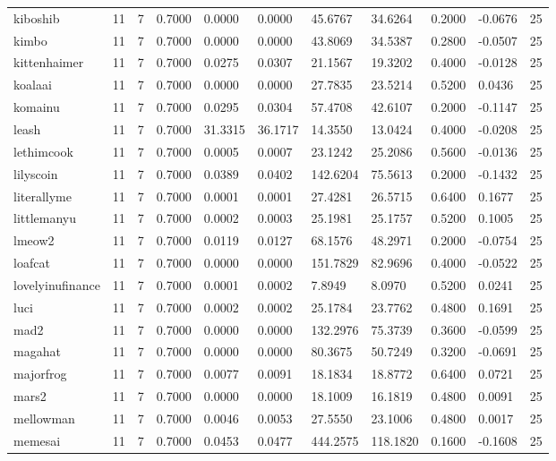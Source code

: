 \begin{table}[htbp]
\begin{tabular}{lllllllllll}
kiboshib & 11 & 7 & 0.7000 & 0.0000 & 0.0000 & 45.6767 & 34.6264 & 0.2000 & -0.0676 & 25 \\
kimbo & 11 & 7 & 0.7000 & 0.0000 & 0.0000 & 43.8069 & 34.5387 & 0.2800 & -0.0507 & 25 \\
kittenhaimer & 11 & 7 & 0.7000 & 0.0275 & 0.0307 & 21.1567 & 19.3202 & 0.4000 & -0.0128 & 25 \\
koalaai & 11 & 7 & 0.7000 & 0.0000 & 0.0000 & 27.7835 & 23.5214 & 0.5200 & 0.0436 & 25 \\
komainu & 11 & 7 & 0.7000 & 0.0295 & 0.0304 & 57.4708 & 42.6107 & 0.2000 & -0.1147 & 25 \\
leash & 11 & 7 & 0.7000 & 31.3315 & 36.1717 & 14.3550 & 13.0424 & 0.4000 & -0.0208 & 25 \\
lethimcook & 11 & 7 & 0.7000 & 0.0005 & 0.0007 & 23.1242 & 25.2086 & 0.5600 & -0.0136 & 25 \\
lilyscoin & 11 & 7 & 0.7000 & 0.0389 & 0.0402 & 142.6204 & 75.5613 & 0.2000 & -0.1432 & 25 \\
literallyme & 11 & 7 & 0.7000 & 0.0001 & 0.0001 & 27.4281 & 26.5715 & 0.6400 & 0.1677 & 25 \\
littlemanyu & 11 & 7 & 0.7000 & 0.0002 & 0.0003 & 25.1981 & 25.1757 & 0.5200 & 0.1005 & 25 \\
lmeow2 & 11 & 7 & 0.7000 & 0.0119 & 0.0127 & 68.1576 & 48.2971 & 0.2000 & -0.0754 & 25 \\
loafcat & 11 & 7 & 0.7000 & 0.0000 & 0.0000 & 151.7829 & 82.9696 & 0.4000 & -0.0522 & 25 \\
lovelyinufinance & 11 & 7 & 0.7000 & 0.0001 & 0.0002 & 7.8949 & 8.0970 & 0.5200 & 0.0241 & 25 \\
luci & 11 & 7 & 0.7000 & 0.0002 & 0.0002 & 25.1784 & 23.7762 & 0.4800 & 0.1691 & 25 \\
mad2 & 11 & 7 & 0.7000 & 0.0000 & 0.0000 & 132.2976 & 75.3739 & 0.3600 & -0.0599 & 25 \\
magahat & 11 & 7 & 0.7000 & 0.0000 & 0.0000 & 80.3675 & 50.7249 & 0.3200 & -0.0691 & 25 \\
majorfrog & 11 & 7 & 0.7000 & 0.0077 & 0.0091 & 18.1834 & 18.8772 & 0.6400 & 0.0721 & 25 \\
mars2 & 11 & 7 & 0.7000 & 0.0000 & 0.0000 & 18.1009 & 16.1819 & 0.4800 & 0.0091 & 25 \\
mellowman & 11 & 7 & 0.7000 & 0.0046 & 0.0053 & 27.5550 & 23.1006 & 0.4800 & 0.0017 & 25 \\
memesai & 11 & 7 & 0.7000 & 0.0453 & 0.0477 & 444.2575 & 118.1820 & 0.1600 & -0.1608 & 25 \\

\end{tabular}
\end{table}
